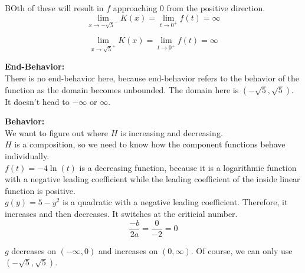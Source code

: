 \documentclass{ximera}
\begin{document}
BOth of these will result in $f$ approaching $0$ from the positive direction. \\



\[
\lim\limits_{x \to -\sqrt{5}^-} K(x)  = \lim\limits_{t \to 0^+} f(t) = \infty
\]



\[
\lim\limits_{x \to \sqrt{5}^+} K(x)  = \lim\limits_{t \to 0^+} f(t) = \infty
\]
















\textbf{\textcolor{blue!55!black}{End-Behavior:}} \\

There is no end-behavior here, because end-behavior refers to the behavior of the function as the domain becomes unbounded.  The domain here is $(-\sqrt{5}, \sqrt{5})$. It doesn't head to $-\infty$ or $\infty$.











\textbf{\textcolor{blue!55!black}{Behavior:}} \\


We want to figure out where $H$ is increasing and decreasing. \\

$H$ is a composition, so we need to know how the component functions behave individually. \\





$f(t) = -4 \ln(t)$ is a decreasing function, because it is a logarithmic function with a negative leading coefficient while the leading coefficient of the inside linear function is  positive. \\

$g(y) = 5 - y^2$ is a quadratic with a negative leading coefficient.  Therefore, it increases and then decreases.   It switches at the criticial number.\\



\[
\frac{-b}{2 a} = \frac{0}{-2} = 0
\]


$g$ decreases on $(-\infty, 0)$ and increases on $(0, \infty)$.  Of course, we can only use $(-\sqrt{5}, \sqrt{5})$.
\end{document}

